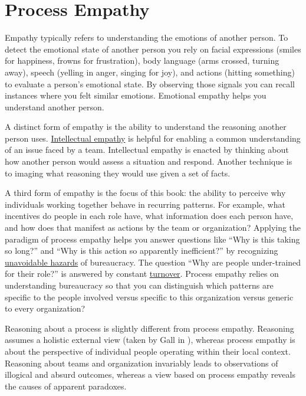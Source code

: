 \section{Process Empathy\label{sec:process-empathy}}

Empathy typically refers to understanding the emotions of another person. To detect the emotional state of another person you rely on facial expressions (smiles for happiness, frowns for frustration), body language (arms crossed, turning away), speech (yelling in anger, singing for joy), and actions (hitting something) to evaluate a person's emotional state. By observing those signals you can recall instances where you felt similar emotions. Emotional empathy helps you understand another person. 

A distinct form of empathy is the ability to understand the reasoning another person uses.  
\hyperref[sec:intellectual-empathy]{Intellectual empathy} is helpful for enabling a common understanding of an issue faced by a team. Intellectual empathy is enacted by thinking about how another person would assess a situation and respond. Another technique is to imaging what reasoning they would use given a set of facts. 


A third form of empathy is the focus of this book: the ability to perceive why individuals working together behave in recurring patterns. For example, what incentives do people in each role have, what information does each person have, and how does that manifest as actions by the team or organization? Applying the paradigm of \gls{process empathy} helps you answer questions like ``Why is this taking so long?'' and ``Why is this action so apparently inefficient?'' by recognizing \hyperref[sec:unavoidable-hazards]{unavoidable hazards} of bureaucracy. The question ``Why are people under-trained for their role?'' is answered by constant \hyperref[sec:turnover]{turnover}. Process empathy relies on understanding bureaucracy so that you can distinguish which patterns are specific to the people involved versus specific to this organization versus generic to every organization?

Reasoning about a process is slightly different from process empathy. Reasoning assumes a holistic external view (taken by Gall in \cite{2002_Gall}), whereas process empathy is about the perspective of individual people operating within their local context. Reasoning about teams and organization invariably leads to observations of illogical and absurd outcomes, whereas a view based on process empathy reveals the causes of apparent paradoxes.

